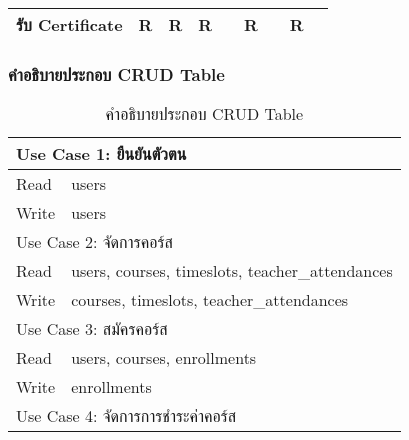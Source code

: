 \begin{landscape}
\begin{table}[H]
\begin{tabularx}{\textwidth}{|l|X|X|X|l|X|l|X|l|}
\textbf{รับ Certificate}          & R              & R                     & R                     &                                        & R                     &                                                    & R                             &                                              \\ \hline
\end{tabularx}
\end{table}
\end{landscape}

\subsubsection{คำอธิบายประกอบ CRUD Table}

\begin{table}[H]
\caption{คำอธิบายประกอบ CRUD Table}
\label{tab:crud-description}
\begin{tabularx}{\textwidth}{|ll|}
\hline
\multicolumn{2}{|l|}{Use Case 1: ยืนยันตัวตน}                                                                    \\ \hline
\multicolumn{1}{|l|}{Read}  & users                                                                              \\ \hline
\multicolumn{1}{|l|}{Write} & users                                                                              \\ \hline
\multicolumn{2}{|l|}{Use Case 2: จัดการคอร์ส}                                                                    \\ \hline
\multicolumn{1}{|l|}{Read}  & users, courses, timeslots, teacher\_attendances                                    \\ \hline
\multicolumn{1}{|l|}{Write} & courses, timeslots, teacher\_attendances                                           \\ \hline
\multicolumn{2}{|l|}{Use Case 3: สมัครคอร์ส}                                                                     \\ \hline
\multicolumn{1}{|l|}{Read}  & users, courses, enrollments                                                        \\ \hline
\multicolumn{1}{|l|}{Write} & enrollments                                                                        \\ \hline
\multicolumn{2}{|l|}{Use Case 4: จัดการการชำระค่าคอร์ส}                                                          \\ \hline

\end{tabularx}
\end{table}
